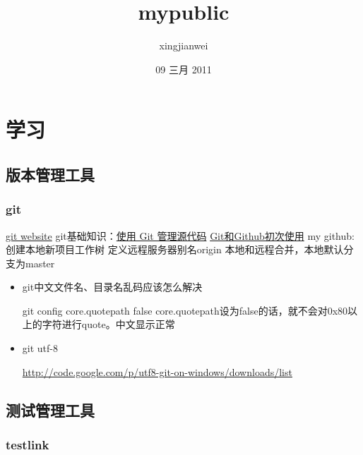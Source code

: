 \documentclass[11pt]{article}
\title{mypublic}
\author{xingjianwei}
\date{09 三月 2011}
\begin{document}
\maketitle

\setcounter{tocdepth}{3}
\tableofcontents
\vspace*{1cm}
\section{学习}
\label{sec-1}

\subsection{版本管理工具}
\label{sec-1.1}

\subsubsection{git}
\label{sec-1.1.1}

\href{http://git-scm.com/}{git website}
git基础知识：\href{http://www.ibm.com/developerworks/cn/linux/l-git/}{使用 Git 管理源代码}  \href{http://www.opensourceforce.org/news/kaiyuanxinwen/20100423/117435.html}{Git和Github初次使用}
my github:
创建本地新项目工作树
定义远程服务器别名origin
本地和远程合并，本地默认分支为master

\begin{itemize}

\item git中文文件名、目录名乱码应该怎么解决\\
\label{sec-1.1.1.1}

git config core.quotepath false
core.quotepath设为false的话，就不会对0x80以上的字符进行quote。中文显示正常


\item git utf-8\\
\label{sec-1.1.1.2}

\href{http://code.google.com/p/utf8-git-on-windows/downloads/list}{http://code.google.com/p/utf8-git-on-windows/downloads/list}

\end{itemize} %
\subsection{测试管理工具}
\label{sec-1.2}

\subsubsection{testlink}
\label{sec-1.2.1}
\end{document}
